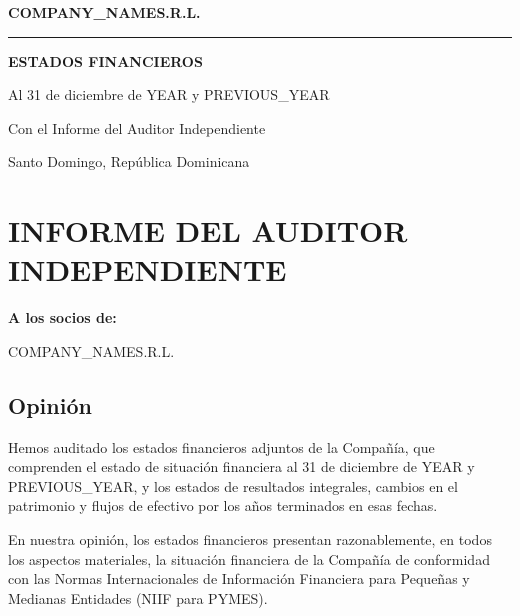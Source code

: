 \documentclass[10pt,letterpaper]{article}
\begin{document}

\begin{titlepage}
\centering

\vspace*{4cm}

{\Huge\textbf{{{COMPANY_NAME}}S.R.L.}}

\vspace{1cm}

\rule{12cm}{1pt}

\vspace{1.5cm}

{\Large\textbf{ESTADOS FINANCIEROS}}

\vspace{0.5cm}

Al 31 de diciembre de {{YEAR}} y {{PREVIOUS_YEAR}}

\vspace{0.5cm}

Con el Informe del Auditor Independiente

\vfill

Santo Domingo, República Dominicana

\end{titlepage}

\newpage


\section*{INFORME DEL AUDITOR INDEPENDIENTE}

\textbf{A los socios de:}

{{COMPANY_NAME}}S.R.L.

\subsection*{Opinión}

Hemos auditado los estados financieros adjuntos de la Compañía, que comprenden el estado de situación financiera al 31 de diciembre de {{YEAR}} y {{PREVIOUS_YEAR}}, y los estados de resultados integrales, cambios en el patrimonio y flujos de efectivo por los años terminados en esas fechas.

En nuestra opinión, los estados financieros presentan razonablemente, en todos los aspectos materiales, la situación financiera de la Compañía de conformidad con las Normas Internacionales de Información Financiera para Pequeñas y Medianas Entidades (NIIF para PYMES).
\end{document}
